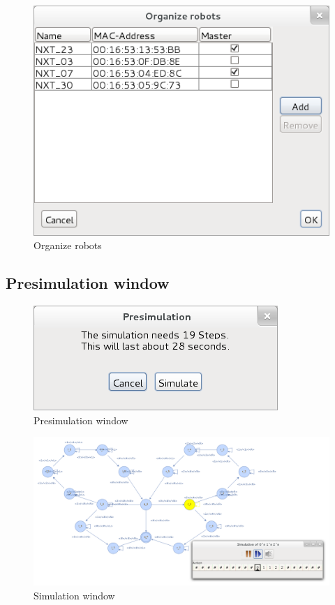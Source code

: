 \documentclass[%
  a4paper,%
  11pt,%
  blue,%
  hyperref	%
  ]{tubsartcl}
\begin{document}
\begin{figure}[!htb]
\begin{center}
\includegraphics[scale=0.45]{graphics_gui/organize_robots.png}
\end{center}
\caption{Organize robots}
\label{pic:organize_robots}
\end{figure}

\newpage

\subsection{Presimulation window}

\begin{figure}[!htb]
\begin{center}
\includegraphics[scale=0.4]{graphics_gui/presimulation.png}
\end{center}
\caption{Presimulation window}
\label{pic:presimulation}
\end{figure}

\begin{figure}[!htb]
\begin{center}
\includegraphics[scale=0.35]{graphics_gui/simulation_window.png}
\end{center}
\caption{Simulation window}
\label{pic:simulation_window}
\end{figure}
\end{document}
